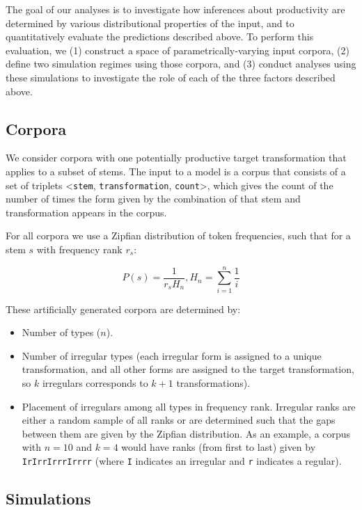 \documentclass[
   11pt,
       ]{book}
\begin{document}
The goal of our analyses is to investigate how inferences about productivity are
determined by various distributional properties of the input, and to
quantitatively evaluate the predictions described above. To perform this
evaluation, we (1) construct a space of parametrically-varying input corpora,
(2) define two simulation regimes using those corpora, and (3) conduct analyses
using these simulations to investigate the role of each of the three factors
described above.

\hypertarget{corpora}{%
\subsection{Corpora}\label{corpora}}

We consider corpora with one potentially productive target transformation that
applies to a subset of stems. The input to a model is a corpus that consists of
a set of triplets \textless{}\texttt{stem}, \texttt{transformation}, \texttt{count}\textgreater, which gives the count of
the number of times the form given by the combination of that stem and
transformation appears in the corpus.

For all corpora we use a Zipfian distribution of token frequencies, such that
for a stem \(s\) with frequency rank \(r_s\):

\[ P(s) = \frac{1}{r_s H_n}, H_n = \sum_{i = 1}^n \frac{1}{i} \]

These artificially generated corpora are determined by:

\begin{itemize}
\item
  Number of types (\(n\)).
\item
  Number of irregular types (each irregular form is assigned to a unique
  transformation, and all other forms are assigned to the target
  transformation, so \(k\) irregulars corresponds to \(k + 1\) transformations).
\item
  Placement of irregulars among all types in frequency rank. Irregular ranks
  are either a random sample of all ranks or are determined such that the gaps
  between them are given by the Zipfian distribution. As an example, a corpus
  with \(n=10\) and \(k=4\) would have ranks (from first to last) given by
  \texttt{IrIrrIrrrIrrrr} (where \texttt{I} indicates an irregular and \texttt{r} indicates a
  regular).
\end{itemize}

\hypertarget{simulations}{%
\subsection{Simulations}\label{simulations}}
\end{document}
